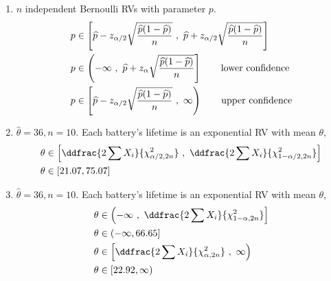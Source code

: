 \begin{enumerate}
	\item $ n $ independent Bernoulli RVs with parameter $ p $. \\
	
	\begin{subequations}
		\begin{align}
			p &\in \left[ \widehat{p} - z_{\alpha/2}\sqrt{\frac{\widehat{p}(1-\widehat{p})}{n}}\ ,\ \widehat{p} + z_{\alpha/2}\sqrt{\frac{\widehat{p}(1-\widehat{p})}{n}}  \right] \\
			p &\in \left( -\infty\ ,\ \widehat{p} + z_{\alpha}\sqrt{\frac{\widehat{p}(1-\widehat{p})}{n}}  \right] \qquad \text{lower confidence}\\
			p &\in \left[ \widehat{p} - z_{\alpha/2}\sqrt{\frac{\widehat{p}(1-\widehat{p})}{n}}\ ,\ \infty  \right) \qquad \text{upper confidence}
		\end{align}\\
	\end{subequations}
	
	\item $ \widehat{\theta}  = 36, n = 10$. Each battery's lifetime is an exponential RV with mean $ \theta $, \\
	\begin{subequations}
		\begin{align}
			\theta &\in \left[\ddfrac{2 \sum X_i}{\chi^2_{\alpha/2, 2n}}\ ,\ \ddfrac{2 \sum X_i}{\chi^2_{1 - \alpha/2, 2n}}\right] \nonumber \\
			\theta &\in [21.07, 75.07]
		\end{align}\\
	\end{subequations}
	
	\item $ \widehat{\theta}  = 36, n = 10$. Each battery's lifetime is an exponential RV with mean $ \theta $, \\
	\begin{subequations}
		\begin{align}
			\theta &\in \left(-\infty\ ,\ \ddfrac{2 \sum X_i}{\chi^2_{1 - \alpha, 2n}}\right] \nonumber \\
			\theta &\in (-\infty, 66.65] \\
			\theta &\in \left[\ddfrac{2 \sum X_i}{\chi^2_{\alpha, 2n}}\ ,\ \infty \right) \nonumber \\
			\theta &\in [22.92, \infty)
		\end{align}\\
	\end{subequations}


\end{enumerate}
